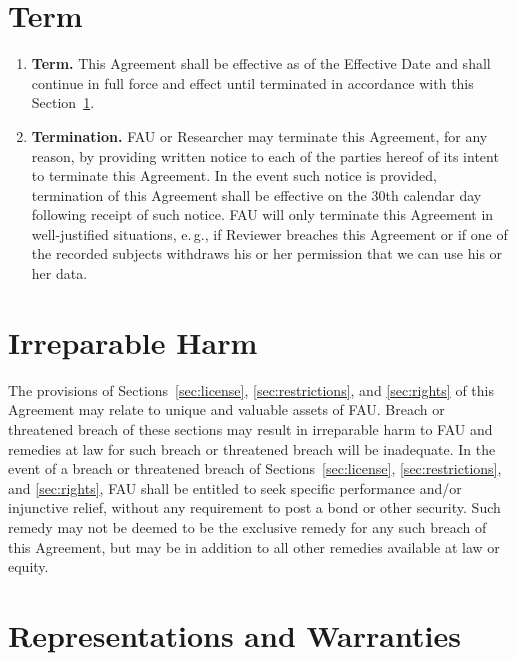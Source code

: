 \documentclass[11pt]{article}
\begin{document}
\begin{Form}
  \section{Term}
  \label{sec:term}

  \begin{enumerate}[label=\alph*)]
    \item \textbf{Term.}
      This Agreement shall be effective as of the Effective Date and shall continue in full force and effect until terminated in accordance with this Section~\ref{sec:term}.
    \item \textbf{Termination.}
      FAU or Researcher may terminate this Agreement, for any reason, by providing written notice to each of the parties hereof of its intent to terminate this Agreement.
      In the event such notice is provided, termination of this Agreement shall be effective on the 30th calendar day following receipt of such notice.
      FAU will only terminate this Agreement in well-justified situations, e.\,g., if Reviewer breaches this Agreement or if one of the recorded subjects withdraws his or her permission that we can use his or her data.
  \end{enumerate}
  

  \section{Irreparable Harm}
  \label{sec:harm}

  The provisions of Sections~\ref{sec:license}, \ref{sec:restrictions}, and \ref{sec:rights} of this Agreement may relate to unique and valuable assets of FAU.
  Breach or threatened breach of these sections may result in irreparable harm to FAU and remedies at law for such breach or threatened breach will be inadequate.  
  In the event of a breach or threatened breach of Sections~\ref{sec:license}, \ref{sec:restrictions}, and \ref{sec:rights}, FAU shall be entitled to seek specific performance and/or injunctive relief, without any requirement to post a bond or other security.
  Such remedy may not be deemed to be the exclusive remedy for any such breach of this Agreement, but may be in addition to all other remedies available at law or equity. 

  
  \section{Representations and Warranties}
  \label{sec:representations}


\end{Form}
\end{document}
